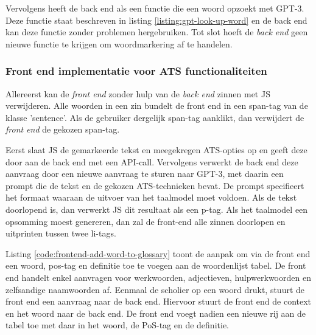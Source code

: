 
Vervolgens heeft de back end als een functie die een woord opzoekt met GPT-3. Deze functie staat beschreven in listing \ref{listing:gpt-look-up-word} en de back end kan deze functie zonder problemen hergebruiken. Tot slot hoeft de \textit{back end} geen nieuwe functie te krijgen om woordmarkering af te handelen.

\subsubsection{Front end implementatie voor ATS functionaliteiten}


Allereerst kan de \textit{front end} zonder hulp van de \textit{back end} zinnen met JS verwijderen. Alle woorden in een zin bundelt de front end in een span-tag van de klasse 'sentence'. Als de gebruiker dergelijk span-tag aanklikt, dan verwijdert de \textit{front end} de gekozen span-tag.


Eerst slaat JS de gemarkeerde tekst en meegekregen ATS-opties op en geeft deze door aan de back end met een API-call. Vervolgens verwerkt de back end deze aanvraag door een nieuwe aanvraag te sturen naar GPT-3, met daarin een prompt die de tekst en de gekozen ATS-technieken bevat. De prompt specifieert het formaat waaraan de uitvoer van het taalmodel moet voldoen.  Als de tekst doorlopend is, dan verwerkt JS dit resultaat als een p-tag.  Als het taalmodel een opsomming moest genereren, dan zal de front-end alle zinnen doorlopen en uitprinten tussen twee li-tags.


Listing \ref{code:frontend-add-word-to-glossary} toont de aanpak om via de front end een woord, pos-tag en definitie toe te voegen aan de woordenlijst tabel. De front end handelt enkel aanvragen voor werkwoorden, adjectieven, hulpwerkwoorden en zelfsandige naamwoorden af. Eenmaal de scholier op een woord drukt, stuurt de front end een aanvraag naar de back end. Hiervoor stuurt de front end de context en het woord naar de back end. De front end voegt nadien een nieuwe rij aan de tabel toe met daar in het woord, de PoS-tag en de definitie.

